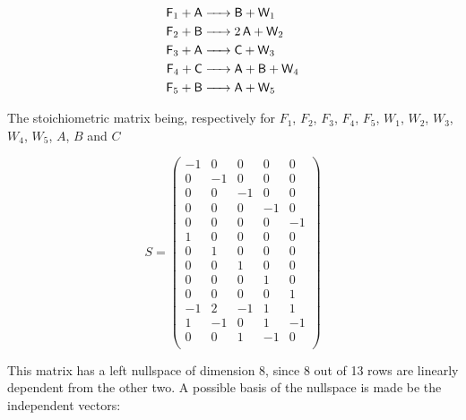 \documentclass{article}
\begin{document}
\begin{equation}\label{reaction_12}
		\begin{split}
  \ce{\textsf{F}_1 + \textsf{A}& -> \textsf{B} + \textsf{W}_1 }	\\
  \ce{\textsf{F}_2 + \textsf{B}& -> 2\textsf{A} + \textsf{W}_2} \\
  \ce{\textsf{F}_3 + \textsf{A}& -> \textsf{C} + \textsf{W}_3 } \\
  \ce{\textsf{F}_4 + \textsf{C}& -> \textsf{A} + \textsf{B} + \textsf{W}_4 } \\
  \ce{\textsf{F}_5 + \textsf{B}& -> \textsf{A} + \textsf{W}_5 }
		\end{split} 
\end{equation}


The stoichiometric matrix being, respectively for $F_1$, $F_2$, $F_3$, $F_4$, $F_5$, $W_1$, $W_2$, $W_3$, $W_4$, $W_5$, $A$, $B$ and $C$

\begin{center}
    \begin{equation}
        S=\begin{pmatrix}
            -1 & 0 & 0 & 0 & 0 \\
            0 & -1 & 0 & 0 & 0 \\
            0 & 0 & -1 & 0 & 0 \\
            0 & 0 & 0 & -1 & 0 \\
            0 & 0 & 0 & 0 & -1 \\
            1 & 0 & 0 & 0 & 0 \\
            0 & 1 & 0 & 0 & 0 \\
            0 & 0 & 1 & 0 & 0 \\
            0 & 0 & 0 & 1 & 0 \\
            0 & 0 & 0 & 0 & 1 \\
            -1 & 2 & -1 & 1 & 1 \\
            1 & -1 & 0 & 1 & -1 \\
            0 & 0 & 1 & -1 & 0 \\
            
\end{pmatrix}
    \end{equation}
\end{center}

This matrix has a left nullspace of dimension 8, since 8 out of 13 rows are linearly dependent from the other two. A possible basis of the nullspace is made be the independent vectors:
\end{document}
